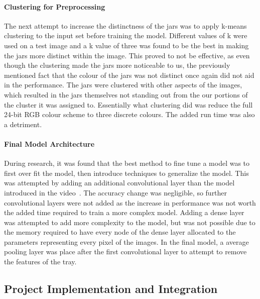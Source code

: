\documentclass[11pt]{article}
\begin{document}
                \paragraph{Clustering for Preprocessing}
                    The next attempt to increase the distinctness of the jars was to apply k-means clustering to the input set before training the model. Different values of k were used on a test image and a k value of three was found to be the best in making the jars more distinct within the image. This proved to not be effective, as even though the clustering made the jars more noticeable to us, the previously mentioned fact that the colour of the jars was not distinct once again did not aid in the performance. The jars were clustered with other aspects of the images, which resulted in the jars themselves not standing out from the our portions of the cluster it was assigned to. Essentially what clustering did was reduce the full 24-bit RGB colour scheme to three discrete colours. The added run time was also a detriment. 

                \paragraph{Final Model Architecture}
                    During research, it was found that the best method to fine tune a model was to first over fit the model, then introduce techniques to generalize the model. This was attempted by adding an additional convolutional layer than the model introduced in the video~\cite{saif}. The accuracy change was negligible, so further convolutional layers were not added as the increase in performance was not worth the added time required to train a more complex model. Adding a dense layer was attempted to add more complexity to the model, but was not possible due to the memory required to have every node of the dense layer allocated to the parameters representing every pixel of the images. In the final model, a average pooling layer was place after the first convolutional layer to attempt to remove the features of the tray. 

        \subsection{Project Implementation and Integration}
\end{document}
